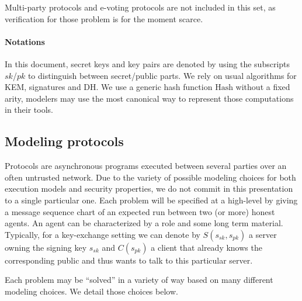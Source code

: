 \documentclass{article}
\newcommand{\sfsk}{\mathit{sk}}
\newcommand{\sfpk}{\mathit{pk}}
\newcommand{\kwf}[1]{\mathrm{#1}}
\newcommand{\hash}{\kwf{Hash}}
\begin{document}
Multi-party protocols and e-voting protocols are not included in this set, as verification for those problem is for the moment scarce.

\paragraph{Notations} In this document, secret keys and key pairs are denoted by using the subscripts $\sfsk$/$\sfpk$ to distinguish between secret/public parts. We rely on usual algorithms for KEM, signatures and DH. We use a generic hash function $\hash$ without a fixed arity, modelers may use the most canonical way to represent those computations in their tools.


\subsection{Modeling protocols}

Protocols are asynchronous programs executed between several parties over an often untrusted network. Due to the variety of possible modeling choices for both execution models and security properties, we do not commit in this presentation to a single particular one. Each problem will be specified at a high-level by giving a message sequence chart of an expected run between two (or more) honest agents. An agent can be characterized by a role and some long term material. Typically, for a key-exchange setting we can denote by $S(s_\sfsk,s_\sfpk)$ a server  owning the signing key $s_\sfsk$ and $C(s_\sfpk)$ a client that already knows the corresponding public and thus wants to talk to this particular server.


Each problem may be ``solved'' in a variety of way based on many different modeling choices. We detail those choices below.
\end{document}
